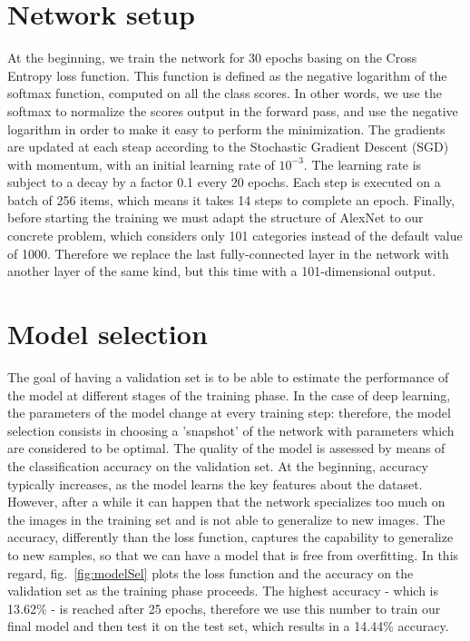 \documentclass[11pt,twoside,a4paper]{article}
\begin{document}
\section{Network setup}
\label{netSetup}
At the beginning, we train the network for 30 epochs basing on the Cross Entropy loss function. This function is defined as the negative logarithm of the softmax function, computed on all the class scores. In other words, we use the softmax to normalize the scores output in the forward pass, and use the negative logarithm in order to make it easy to perform the minimization.\newline
The gradients are updated at each steap according to the Stochastic Gradient Descent (SGD) with momentum, with an initial learning rate of $10^{-3}$. The learning rate is subject to a decay by a factor 0.1 every 20 epochs. Each step is executed on a batch of 256 items, which means it takes 14 steps to complete an epoch.\newline
Finally, before starting the training we must adapt the structure of AlexNet to our concrete problem, which considers only 101 categories instead of the default value of 1000. Therefore we replace the last fully-connected layer in the network with another layer of the same kind, but this time with a 101-dimensional output.

\section{Model selection}
\label{modSel}
The goal of having a validation set is to be able to estimate the performance of the model at different stages of the training phase. In the case of deep learning, the parameters of the model change at every training step: therefore, the model selection consists in choosing a 'snapshot' of the network with parameters which are considered to be optimal. The quality of the model is assessed by means of the classification accuracy on the validation set.\newline
At the beginning, accuracy typically increases, as the model learns the key features about the dataset. However, after a while it can happen that the network specializes too much on the images in the training set and is not able to generalize to new images. The accuracy, differently than the loss function, captures the capability to generalize to new samples, so that we can have a model that is free from overfitting. \newline
In this regard, fig.~\ref{fig:modelSel} plots the loss function and the accuracy on the validation set as the training phase proceeds. The highest accuracy - which is 13.62\% - is reached after 25 epochs, therefore we use this number to train our final model and then test it on the test set, which results in a 14.44\% accuracy.
\end{document}
